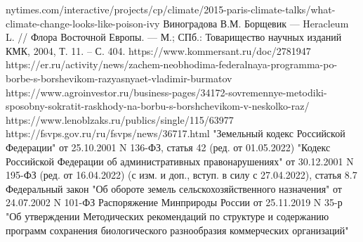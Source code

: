 \begin{thebibliography}{99}
	
	
	nytimes.com/interactive/projects/cp/climate/2015-paris-climate-talks/what-climate-change-looks-like-poison-ivy
	 Виноградова В.М. Борщевик — Heracleum L. // Флора Восточной Европы. — М.; СПб.: Товарищество научных изданий КМК, 2004, Т. 11. – С. 404.
	 https://www.kommersant.ru/doc/2781947
	 https://er.ru/activity/news/zachem-neobhodima-federalnaya-programma-po-borbe-s-borshevikom-razyasnyaet-vladimir-burmatov
	 https://www.agroinvestor.ru/business-pages/34172-sovremennye-metodiki-sposobny-sokratit-raskhody-na-borbu-s-borshchevikom-v-neskolko-raz/
	 https://www.lenoblzaks.ru/publics/single/115/63977
	 https://fsvps.gov.ru/ru/fsvps/news/36717.html
	 "Земельный кодекс Российской Федерации" от 25.10.2001 N 136-ФЗ, статья 42 (ред. от 01.05.2022)
	 "Кодекс Российской Федерации об административных правонарушениях" от 30.12.2001 N 195-ФЗ (ред. от 16.04.2022) (с изм. и доп., вступ. в силу с 27.04.2022), статья 8.7
	 Федеральный закон "Об обороте земель сельскохозяйственного назначения" от 24.07.2002 N 101-ФЗ
	 Распоряжение Минприроды России от 25.11.2019 N 35-р "Об утверждении Методических рекомендаций по структуре и содержанию программ сохранения биологического разнообразия коммерческих организаций"
	
\end{thebibliography}

